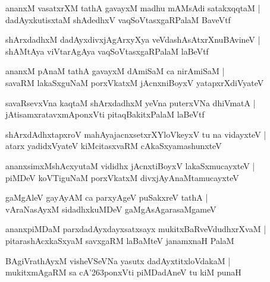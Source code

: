 \documentclass[twoside,12pt,openright]{book}
\def\S{\char'263}
\newcounter{shloka}[chapter]
\begin{document}
\begin{shloka}%
ananxM vasatxrXM tathA gavayxM madhu mAMsAdi satakxqqtaM |\\
dadAyxkutisxtaM shAdedhxV vaqSoVtasxgaRPalaM BaveVtf 
\end{shloka}

\begin{shloka}%
shArxdadhxM dadAyxdivxjAgArxyXya veVdashAsAtxrXnuBAvineV |\\
shAMtAya viVtarAgAya vaqSoVtasxgaRPalaM laBeVtf
\end{shloka}

\begin{shloka}%
ananxM pAnaM tathA gavayxM dAmiSaM ca nirAmiSaM |\\
savaRM lakaSxguNaM porxVkatxM jAcnxniBoyxV yatapxrXdiVyateV 
\end{shloka}

\begin{shloka}%
savaRsevxVna kaqtaM shArxdadhxM yeVna puterxVNa dhiVmatA |\\
jAtisamxratavxmAponxVti pitaqBakitxPalaM laBeVtf
\end{shloka}

\begin{shloka}%
shArxdAdhxtapxroV mahAyajacnxsetxrXYloVkeyxV tu na vidayxteV |\\
atarx yadidxVyateV kiMcitasxvaRM cAkaSxyamashunxteV 
\end{shloka}

\begin{shloka}%
ananxsimxMshAcxyutaM vididhx jAcnxtiBoyxV lakaSxmucayxteV |\\
piMDeV koVTiguNaM porxVkatxM divxjAyAnaMtamucayxteV 
\end{shloka}

\begin{shloka}%
gaMgAleV gayAyAM ca parxyAgeV puSakxreV tathA |\\
vAraNasAyxM sidadhxkuMDeV gaMgAsAgarasaMgameV
\end{shloka}

\begin{shloka}%
ananxpiMDaM parxdadAyxdayxsatxsayx mukitxBaRveVdudhxrXvaM |\\
pitarashAcxkaSxyaM savxgaRM laBaMteV janamxnaH PalaM
\end{shloka}

\begin{shloka}%
BAgiVrathAyxM visheVSeVNa yasutx dadAyxtitxloVdakaM |\\
mukitxmAgaRM sa cA\S ponxVti piMDadAneV tu kiM punaH 
\end{shloka}
\end{document}
